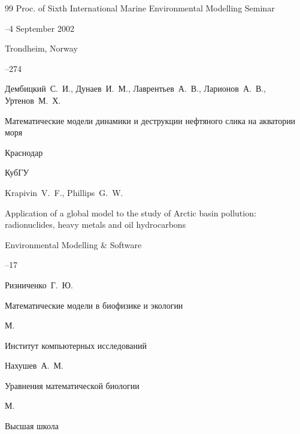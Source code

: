 \begin{thebibliography}{99}
\inbook Proc. of Sixth International Marine Environmental Modelling Seminar

--4 September 2002


\publaddr Trondheim, Norway

--274




\by Дембицкий~С.~И., Дунаев~И.~М., Лаврентьев~А.~В., Ларионов~А.~В., Уртенов~М.~Х.

\book  Математические модели динамики и деструкции нефтяного слика на акватории моря

\publaddr Краснодар

\publ КубГУ






\by Krapivin~V.~F., Phillips~G.~W.

\paper Application of a global model to the study of Arctic basin pollution: radionuclides, heavy metals and oil hydrocarbons

\jour Environmental Modelling \& Software



--17





\by Ризниченко~Г.~Ю.

\book  Математические модели в биофизике и экологии

\publaddr М.

\publ Институт компьютерных исследований






\by Нахушев~А.~М.

\book  Уравнения математической биологии

\publaddr М.

\publ Высшая школа






\end{thebibliography}
